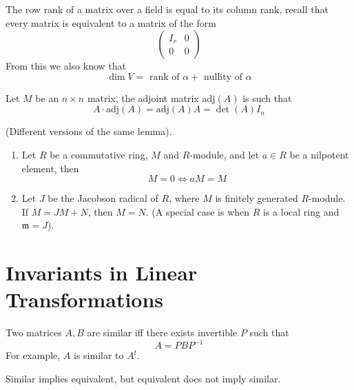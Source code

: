 \documentclass[openany]{book}
\begin{document}
\begin{prop}
    The row rank of a matrix over a field is equal to its column rank, recall that every matrix is equivalent to a matrix of the form 
    \[ 
        \left( 
        \begin{array}{c|c} 
        I_r & 0 \\ 
        \hline 
        0 & 0 
        \end{array} 
        \right) 
        \]
    From this we also know that 
    \begin{equation*}
        \dim V=\text{ rank of }\alpha +\text{ nullity of }\alpha
    \end{equation*}
\end{prop}


\begin{defn}
    Let $M$ be an $n\times n$ matrix, the adjoint matrix $\text{adj}(A)$ is such that 
    \begin{equation*}
        A\cdot\text{adj}(A)=\text{adj}(A)A=\det(A)I_n
    \end{equation*}
\end{defn}

\begin{prop}
    (Different versions of the same lemma).
    \begin{enumerate}
        \item Let $R$ be a commutative ring, $M$ and $R$-module, and let $a\in R$ be a nilpotent element, then
        \begin{equation*}
            M=0\iff aM=M
        \end{equation*}
        \item Let $J$ be the Jacobson radical of $R$, where $M$ is finitely generated $R$-module. If $M=JM+N$, then $M=N$. (A special case is when $R$ is a local ring and $\mathfrak{m}=J$).
    \end{enumerate}
\end{prop}

\section{Invariants in Linear Transformations}

\begin{defn}
    Two matrices $A,B$ are similar iff there exists invertible $P$ such that 
    \begin{equation*}
        A=PBP^{-1}
    \end{equation*}
    For example, $A$ is similar to $A^t$.
\end{defn}
\begin{prop}
    Similar implies equivalent, but equivalent does not imply similar.
\end{prop}
\end{document}
